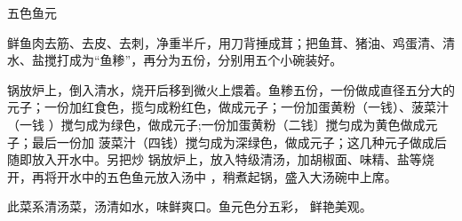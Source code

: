 \begin{recipe}[五福鱼元]{五色鱼元}

\ingredients


\cooking

\step 鲜鱼肉去筋、去皮、去刺，净重半斤，用刀背捶成茸；把鱼茸、猪油、鸡蛋清、清
水、盐搅打成为“鱼糁”，再分为五份，分别用五个小碗装好。

\step 锅放炉上，倒入清水，烧开后移到微火上煨着。鱼糁五份，一份做成直径五分大的
元子；一份加红食色，揽匀成粉红色，做成元子；一份加蛋黄粉（一钱）、菠菜汁（一钱
）搅匀成为绿色，做成元子;一份加蛋黄粉（二钱〕搅匀成为黄色做成元子；最后一份加
菠菜汁（四钱）搅匀成为深绿色，做成元子；这几种元子做成后随即放入开水中。另把炒
锅放炉上，放入特级清汤，加胡椒面、味精、盐等烧开，再将开水中的五色鱼元放入汤中
，稍煮起锅，盛入大汤碗中上席。

\notes

此菜系清汤菜，汤清如水，味鲜爽口。鱼元色分五彩， 鲜艳美观。

\end{recipe}

